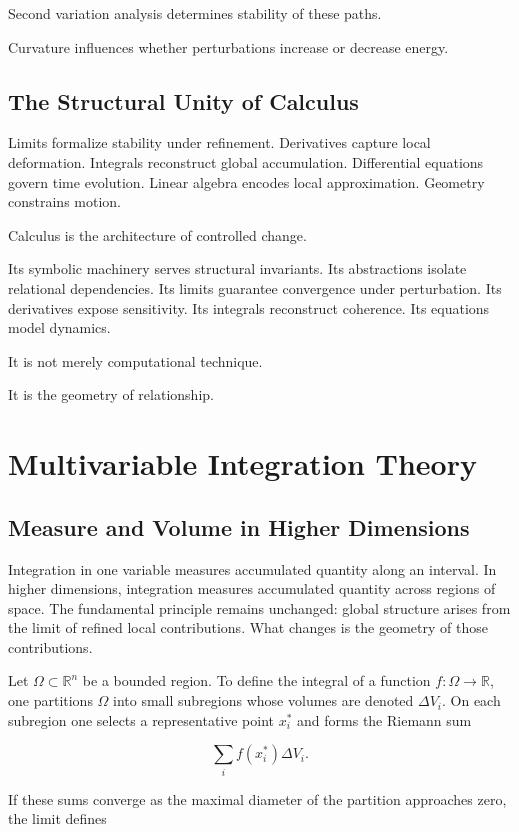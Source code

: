 \documentclass[12pt]{book}
\begin{document}
Second variation analysis determines stability of these paths.

Curvature influences whether perturbations increase or decrease energy.

\section{The Structural Unity of Calculus}

Limits formalize stability under refinement. Derivatives capture local deformation. Integrals reconstruct global accumulation. Differential equations govern time evolution. Linear algebra encodes local approximation. Geometry constrains motion.

Calculus is the architecture of controlled change.

Its symbolic machinery serves structural invariants. Its abstractions isolate relational dependencies. Its limits guarantee convergence under perturbation. Its derivatives expose sensitivity. Its integrals reconstruct coherence. Its equations model dynamics.

It is not merely computational technique.

It is the geometry of relationship.

\chapter{Multivariable Integration Theory}

\section{Measure and Volume in Higher Dimensions}

Integration in one variable measures accumulated quantity along an interval. In higher dimensions, integration measures accumulated quantity across regions of space. The fundamental principle remains unchanged: global structure arises from the limit of refined local contributions. What changes is the geometry of those contributions.

Let $\Omega \subset \mathbb{R}^n$ be a bounded region. To define the integral of a function $f : \Omega \to \mathbb{R}$, one partitions $\Omega$ into small subregions whose volumes are denoted $\Delta V_i$. On each subregion one selects a representative point $x_i^*$ and forms the Riemann sum

\[
\sum_i f(x_i^*) \Delta V_i.
\]

If these sums converge as the maximal diameter of the partition approaches zero, the limit defines
\end{document}
